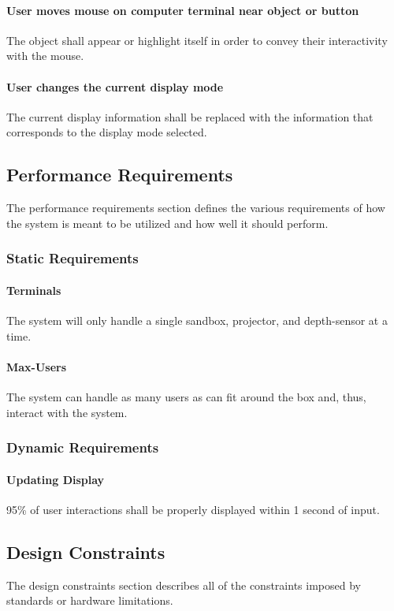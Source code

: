 \documentclass[onecolumn, draftclsnofoot,10pt, compsoc]{IEEEtran}
\begin{document}
\paragraph{User moves mouse on computer terminal near object or button}
The object shall appear or highlight itself in order to convey their interactivity with the mouse.

\paragraph{User changes the current display mode}
The current display information shall be replaced with the information that corresponds to the display mode selected.


\subsection{Performance Requirements}
The performance requirements section defines the various requirements of how the system is meant to be utilized and how well it should perform.

\subsubsection{Static Requirements}
\paragraph{Terminals}
The system will only handle a single sandbox, projector, and depth-sensor at a time.
\paragraph{Max-Users}
The system can handle as many users as can fit around the box and, thus, interact with the system.
\subsubsection{Dynamic Requirements}
\paragraph{Updating Display}
95\% of user interactions shall be properly displayed within 1 second of input.

\subsection{Design Constraints}
The design constraints section describes all of the constraints imposed by standards or hardware limitations.
\end{document}

